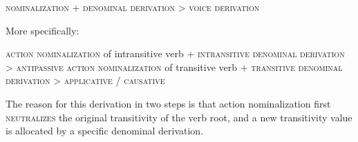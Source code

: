 \documentclass[oldfontcommands,oneside,a4paper,11pt]{article}
\begin{document}
\begin{exe}
\ex
\glt \textsc{nominalization} + \textsc{denominal derivation} > \textsc{voice derivation}
\end{exe}

More specifically:

\begin{exe}
\ex
\glt \textsc{action nominalization} of intransitive verb + \textsc{intransitive denominal derivation} > \textsc{antipassive}
\ex
\glt \textsc{action nominalization} of transitive verb + \textsc{transitive denominal derivation} > \textsc{applicative} / \textsc{causative}
\end{exe}

The reason for this derivation in two steps is that action nominalization first \textsc{neutralizes} the original transitivity of the verb root, and a new transitivity value is allocated by a specific denominal derivation.




\end{document}
